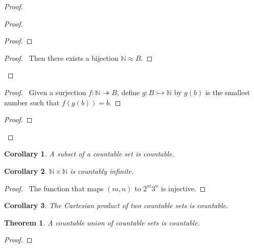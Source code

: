 \documentclass{book}
\let\qed\relax
\newtheorem{cor}{Corollary}[ax]
\newtheorem{thm}[ax]{Theorem}
\theoremstyle{definition}
\begin{document}
\begin{proof}
\pf
{}
\begin{proof}
	\begin{proof}
	\end{proof}
	\begin{proof}
		\pf\ Then there exists a bijection $\mathbb{N} \approx B$.
	\end{proof}
\end{proof}
\begin{proof}
	\pf\ Given a surjection $f : \mathbb{N} \twoheadrightarrow B$, define $g : B \rightarrowtail \mathbb{N}$ by $g(b)$ is the smallest number such that $f(g(b)) = b$.
\end{proof}
\begin{proof}
\end{proof}
\qed
\end{proof}

\begin{cor}
A subset of a countable set is countable.
\end{cor}

\begin{cor}
$\mathbb{N} \times \mathbb{N}$ is countably infinite.
\end{cor}

\begin{proof}
\pf\ The function that maps $(m,n)$ to $2^m 3^n$ is injective. \qed
\end{proof}

\begin{cor}
The Cartesian product of two countable sets is countable.
\end{cor}

\begin{thm}
A countable union of countable sets is countable.
\end{thm}

\begin{proof}
\pf
{}
\qed
\end{proof}
\end{document}
